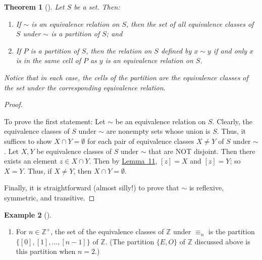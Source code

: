 \documentclass[10pt,openany,oneside]{book}
\theoremstyle{plain}
\newtheorem{theorem}{Theorem}[section]
\theoremstyle{definition}
\theoremstyle{definition}
\theoremstyle{definition}
\newtheorem{example}[theorem]{Example}
\theoremstyle{definition}
\numberwithin{equation}{section}
\def\Z{\mathbb{Z}}
\begin{document}
\begin{theorem}[{}]\label{part_quiv}
Let \(S\) be a set. Then: \leavevmode%
\begin{enumerate}
\item\hypertarget{li-405}{}If \(\sim\) is an equivalence relation on \(S\), then the set of all equivalence classes of \(S\) under \(\sim\) is a partition of \(S\); and%
\item\hypertarget{li-406}{}If \(P\) is a partition of \(S\), then the relation on \(S\) defined by \(x\sim y\) if and only \(x\) is in the same cell of \(P\) as \(y\) is an equivalence relation on \(S\).%
\end{enumerate}
%
\par
Notice that in each case, the cells of the partition are the equivalence classes of the set under the corresponding equivalence relation.%
\end{theorem}
\begin{proof}\hypertarget{proof-34}{}
To prove the first statement: Let \(\sim\) be an equivalence relation on \(S\). Clearly, the equivalence classes of \(S\) under \(\sim\) are nonempty sets whose union is \(S\). Thus, it suffices to show \(X
\cap Y =\emptyset\) for each pair of equivalence classes \(X\neq
Y\) of \(S\) under \(\sim\). Let \(X,Y\) be equivalence classes of \(S\) under \(\sim\) that are NOT disjoint. Then there exists an element \(z\in X\cap Y\). Then by \hyperref[vil_lem]{Lemma~11}, \([z]=X\) and \([z]=Y\); so \(X=Y\). Thus, if \(X\neq Y\), then \(X\cap Y
=\emptyset\).%
\par
Finally, it is straightforward (almost silly!) to prove that \(\sim\) is reflexive, symmetric, and transitive.%
\end{proof}
\begin{example}[]\label{example-66}
\leavevmode%
\begin{enumerate}
\item\hypertarget{li-407}{}For \(n\in \Z^+\), the set of the equivalence classes of \(\Z\) under \(\equiv_n\) is the partition \(\{[0],[1],\ldots,[n-1]\}\) of \(\Z\). (The partition \(\{E
,O\}\) of \(\Z\) discussed above is this partition when \(n=2\).)%
\end{enumerate}
%
\end{example}
\typeout{************************************************}
\typeout{************************************************}
\end{document}
